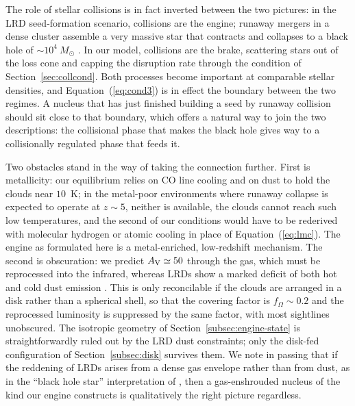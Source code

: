 \documentclass[preprint2]{aastex}
\newcommand{\msun}{M_{\odot}\xspace}
\begin{document}
The role of stellar collisions is in fact inverted between the two pictures: in the LRD seed-formation scenario, collisions are the engine; runaway mergers in a dense cluster assemble a very massive star that contracts and collapses to a black hole of $\sim 10^{4}~\msun$ \citep{Pacucci:2025a}. In our model, collisions are the brake, scattering stars out of the loss cone and capping the disruption rate through the condition of Section~\ref{sec:collcond}. Both processes become important at comparable stellar densities, and Equation~(\ref{eq:cond3}) is in effect the boundary between the two regimes. A nucleus that has just finished building a seed by runaway collision should sit close to that boundary, which offers a natural way to join the two descriptions: the collisional phase that makes the black hole gives way to a collisionally regulated phase that feeds it.

Two obstacles stand in the way of taking the connection further. First is metallicity: our equilibrium relies on CO line cooling and on dust to hold the clouds near $10$~K; in the metal-poor environments where runaway collapse is expected to operate at $z \sim 5$, neither is available, the clouds cannot reach such low temperatures, and the second of our conditions would have to be rederived with molecular hydrogen or atomic cooling in place of Equation~(\ref{eq:lmc}). The engine as formulated here is a metal-enriched, low-redshift mechanism. The second is obscuration: we predict $A_{\rm V} \simeq 50$ through the gas, which must be reprocessed into the infrared, whereas LRDs show a marked deficit of both hot and cold dust emission \citep{Setton:2025a,Chen:2025a}. This is only reconcilable if the clouds are arranged in a disk rather than a spherical shell, so that the covering factor is $f_{\Omega} \sim 0.2$ and the reprocessed luminosity is suppressed by the same factor, with most sightlines unobscured. The isotropic geometry of Section~\ref{subsec:engine-state} is straightforwardly ruled out by the LRD dust constraints; only the disk-fed configuration of Section~\ref{subsec:disk} survives them. We note in passing that if the reddening of LRDs arises from a dense gas envelope rather than from dust, as in the ``black hole star'' interpretation of \citet{Naidu:2025a}, then a gas-enshrouded nucleus of the kind our engine constructs is qualitatively the right picture regardless.
\end{document}
